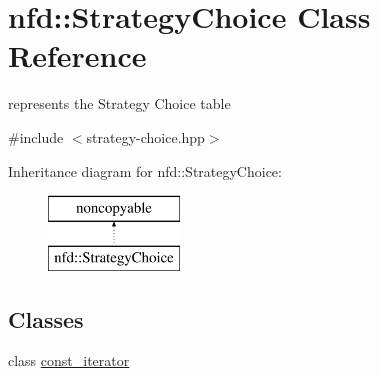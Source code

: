 \hypertarget{classnfd_1_1StrategyChoice}{}\section{nfd\+:\+:Strategy\+Choice Class Reference}
\label{classnfd_1_1StrategyChoice}


represents the Strategy Choice table  




{\ttfamily \#include $<$strategy-\/choice.\+hpp$>$}

Inheritance diagram for nfd\+:\+:Strategy\+Choice\+:\begin{figure}[H]
\begin{center}
\leavevmode
\includegraphics[height=2.000000cm]{classnfd_1_1StrategyChoice}
\end{center}
\end{figure}
\subsection*{Classes}
\begin{DoxyCompactItemize}
\item 
class \hyperlink{classnfd_1_1StrategyChoice_1_1const__iterator}{const\+\_\+iterator}
\end{DoxyCompactItemize}
